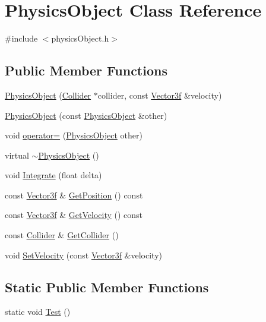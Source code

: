 \hypertarget{class_physics_object}{}\section{Physics\+Object Class Reference}
\label{class_physics_object}


{\ttfamily \#include $<$physics\+Object.\+h$>$}

\subsection*{Public Member Functions}
\begin{DoxyCompactItemize}
\item 
\hyperlink{class_physics_object_a8f3b1480fd01c6dbc0077e594c0fdb25}{Physics\+Object} (\hyperlink{class_collider}{Collider} $\ast$collider, const \hyperlink{class_vector3f}{Vector3f} \&velocity)
\item 
\hyperlink{class_physics_object_ab0616f80555332ac226ba19a5bc85d9d}{Physics\+Object} (const \hyperlink{class_physics_object}{Physics\+Object} \&other)
\item 
void \hyperlink{class_physics_object_a6bdada2302b80562103a7b5e5e61e700}{operator=} (\hyperlink{class_physics_object}{Physics\+Object} other)
\item 
virtual \hyperlink{class_physics_object_a2172e8b71176e3a54d6a8f5ff15d4178}{$\sim$\+Physics\+Object} ()
\item 
void \hyperlink{class_physics_object_ade8f6f54cfd72a3d6ff081f55121980c}{Integrate} (float delta)
\item 
const \hyperlink{class_vector3f}{Vector3f} \& \hyperlink{class_physics_object_ac76b0fb1e128cda164b7cbb0517e27fe}{Get\+Position} () const 
\item 
const \hyperlink{class_vector3f}{Vector3f} \& \hyperlink{class_physics_object_a3516ba15edaac9d10f5dd900fe7d9d7e}{Get\+Velocity} () const 
\item 
const \hyperlink{class_collider}{Collider} \& \hyperlink{class_physics_object_a05ad38aeee61daebf754530bb41500bb}{Get\+Collider} ()
\item 
void \hyperlink{class_physics_object_a19d90029d890abd4e4f5f69bd48cf0aa}{Set\+Velocity} (const \hyperlink{class_vector3f}{Vector3f} \&velocity)
\end{DoxyCompactItemize}
\subsection*{Static Public Member Functions}
\begin{DoxyCompactItemize}
\item 
static void \hyperlink{class_physics_object_adb7b77e74502546484c55341757cfe7d}{Test} ()
\end{DoxyCompactItemize}


